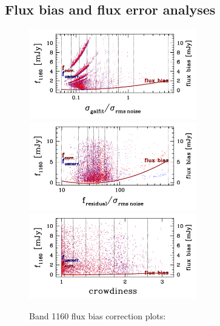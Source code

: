 \documentclass[11pt,a4paper]{article}
\begin{document}
\subsection{Flux bias and flux error analyses}
\label{Band1160_simanalyses}

\begin{figure}[H]
	\caption{
		Band 1160 flux bias correction plots:
	}
	\includegraphics[width=0.65\textwidth]{galsim_1160_fbias_1}
	\includegraphics[width=0.65\textwidth]{galsim_1160_fbias_2}
	\includegraphics[width=0.65\textwidth]{galsim_1160_fbias_3}
\end{figure}
\end{document}
